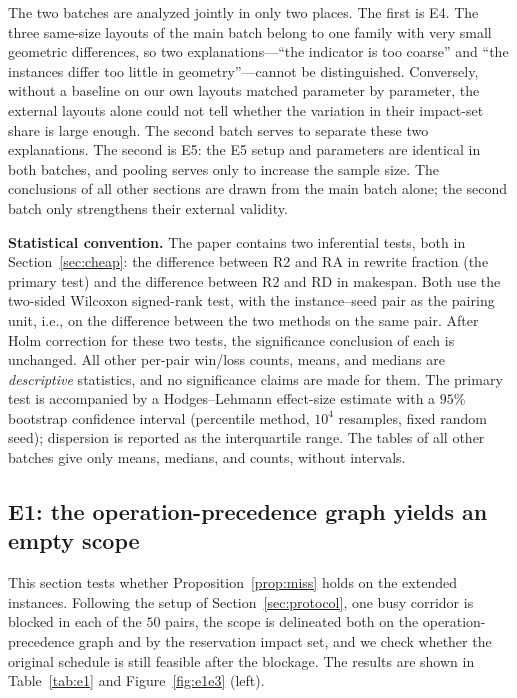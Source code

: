 \documentclass[manuscript,screen,review]{acmart}
\newcommand{\NPairs}{50}
\begin{document}
The two batches are analyzed jointly in only two places. The first is E4. The three same-size layouts of the main batch belong to one family with very small geometric differences,
so two explanations---``the indicator is too coarse'' and ``the instances differ too little in geometry''---cannot be distinguished. Conversely, without a baseline on our own layouts matched parameter by parameter,
the external layouts alone could not tell whether the variation in their impact-set share is large enough. The second batch serves to separate these two explanations.
The second is E5: the E5 setup and parameters are identical in both batches, and pooling serves only to increase the sample size.
The conclusions of all other sections are drawn from the main batch alone; the second batch only strengthens their external validity.

\textbf{Statistical convention.}
The paper contains two inferential tests, both in Section~\ref{sec:cheap}: the difference between R2 and RA in rewrite fraction (the primary test)
and the difference between R2 and RD in makespan. Both use the two-sided Wilcoxon signed-rank test, with the instance--seed pair as the pairing unit, i.e., on the difference between the two methods on the same pair.
After Holm correction for these two tests, the significance conclusion of each is unchanged. All other per-pair win/loss counts, means, and medians
are \emph{descriptive} statistics, and no significance claims are made for them.
The primary test is accompanied by a Hodges--Lehmann effect-size estimate with a \(95\%\) bootstrap confidence interval
(percentile method, \(10^4\) resamples, fixed random seed); dispersion is reported as the interquartile range.
The tables of all other batches give only means, medians, and counts, without intervals.

\subsection{E1: the operation-precedence graph yields an empty scope}
\label{sec:e1}

This section tests whether Proposition~\ref{prop:miss} holds on the extended instances. Following the setup of Section~\ref{sec:protocol},
one busy corridor is blocked in each of the \(\NPairs\) pairs, the scope is delineated both on the operation-precedence graph and by the reservation impact set,
and we check whether the original schedule is still feasible after the blockage. The results are shown in Table~\ref{tab:e1} and Figure~\ref{fig:e1e3} (left).
\end{document}
